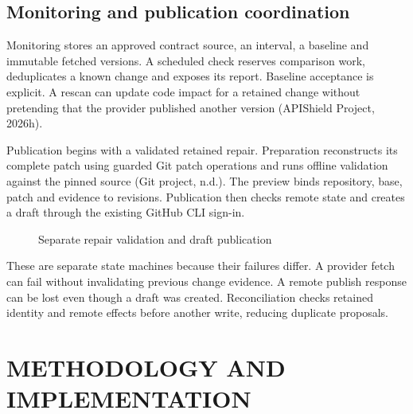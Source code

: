 \documentclass[12pt,a4paper,oneside]{report}
\begin{document}
\section{Monitoring and publication coordination}

Monitoring stores an approved contract source, an interval, a baseline and immutable fetched versions. A scheduled check reserves comparison work, deduplicates a known change and exposes its report. Baseline acceptance is explicit. A rescan can update code impact for a retained change without pretending that the provider published another version (APIShield Project, 2026h).

Publication begins with a validated retained repair. Preparation reconstructs its complete patch using guarded Git patch operations and runs offline validation against the pinned source (Git project, n.d.). The preview binds repository, base, patch and evidence to revisions. Publication then checks remote state and creates a draft through the existing GitHub CLI sign-in.

\begin{figure}[htbp]\centering
{}
\caption{Separate repair validation and draft publication}\label{fig:4.4}
\end{figure}

These are separate state machines because their failures differ. A provider fetch can fail without invalidating previous change evidence. A remote publish response can be lost even though a draft was created. Reconciliation checks retained identity and remote effects before another write, reducing duplicate proposals.





\chapter{METHODOLOGY AND IMPLEMENTATION}
\end{document}
